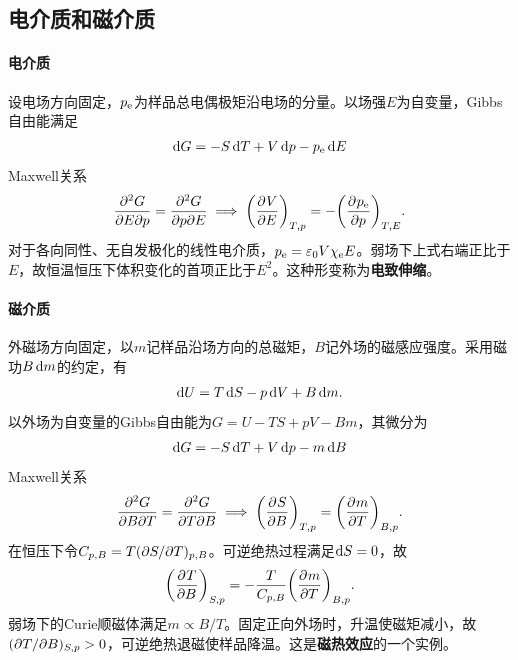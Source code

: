 \subsection{电介质和磁介质}

\paragraph{电介质}

设电场方向固定，$p_\electric$为样品总电偶极矩沿电场的分量。以场强$E$为自变量，Gibbs自由能满足
\begin{equation}
	\label{eq:sm-dielectric-gibbs-differential}
	\d G = -S\d T + V\d p - p_\electric\d E
\end{equation}
Maxwell关系
\begin{equation}
	\pw GEp = \pw GpE \implies
	\pvat{V}{E}{T,p} = -\pvat{p_\electric}{p}{T,E}.
\end{equation}
对于各向同性、无自发极化的线性电介质，$p_\electric = \varepsilon_0 V\chi_\electric E$。弱场下上式右端正比于$E$，故恒温恒压下体积变化的首项正比于$E^2$。这种形变称为\textbf{电致伸缩}。

\paragraph{磁介质}

外磁场方向固定，以$m$记样品沿场方向的总磁矩，$B$记外场的磁感应强度。采用磁功$B\d m$的约定，有
\begin{equation}
	\label{eq:sm-magnetic-first-law}
	\d U = T\d S - p\d V + B\d m.
\end{equation}
以外场为自变量的Gibbs自由能为$G = U - TS + pV - Bm$，其微分为
\begin{equation}
	\label{eq:sm-magnetic-gibbs-differential}
	\d G = -S\d T + V\d p - m\d B
\end{equation}
Maxwell关系
\begin{equation}
	\label{eq:sm-magnetic-maxwell-relation}
	\pw GBT = \pw GTB \implies
	\pvat{S}{B}{T,p} = \pvat{m}{T}{B,p}.
\end{equation}
在恒压下令$C_{p,B} = T(\p S/\p T)_{p,B}$。可逆绝热过程满足$\d S = 0$，故
\begin{equation}
	\label{eq:sm-magnetocaloric-response}
	\pvat{T}{B}{S,p} = -\frac T{C_{p,B}}\pvat{m}{T}{B,p}.
\end{equation}
弱场下的Curie顺磁体满足$m \propto B/T$。固定正向外场时，升温使磁矩减小，故$(\p T/\p B)_{S,p} > 0$，可逆绝热退磁使样品降温。这是\textbf{磁热效应}的一个实例。

